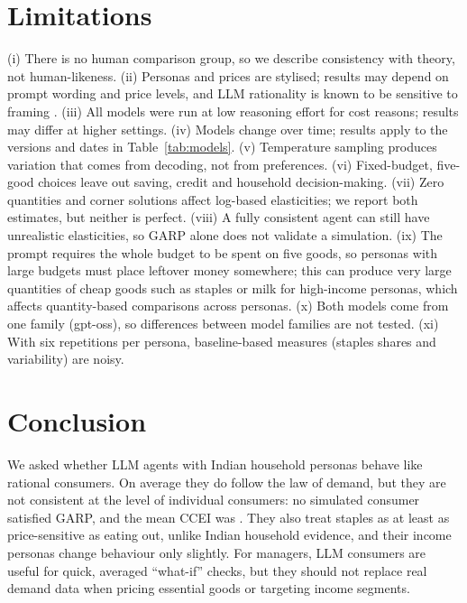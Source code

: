 \documentclass[11pt,a4paper]{article}
\begin{document}
\section{Limitations}
(i) There is no human comparison group, so we describe consistency with theory, not human-likeness. (ii) Personas and prices are stylised; results may depend on prompt wording and price levels, and LLM rationality is known to be sensitive to framing \citep{chen2023}. (iii) All models were run at low reasoning effort for cost reasons; results may differ at higher settings. (iv) Models change over time; results apply to the versions and dates in Table~\ref{tab:models}. (v) Temperature sampling produces variation that comes from decoding, not from preferences. (vi) Fixed-budget, five-good choices leave out saving, credit and household decision-making. (vii) Zero quantities and corner solutions affect log-based elasticities; we report both estimates, but neither is perfect. (viii) A fully consistent agent can still have unrealistic elasticities, so GARP alone does not validate a simulation. (ix) The prompt requires the whole budget to be spent on five goods, so personas with large budgets must place leftover money somewhere; this can produce very large quantities of cheap goods such as staples or milk for high-income personas, which affects quantity-based comparisons across personas. (x) Both models come from one family (gpt-oss), so differences between model families are not tested. (xi) With six repetitions per persona, baseline-based measures (staples shares and variability) are noisy.

\section{Conclusion}
We asked whether LLM agents with Indian household personas behave like rational consumers. On average they do follow the law of demand, but they are not consistent at the level of individual consumers: no simulated consumer satisfied GARP, and the mean CCEI was \MeanCCEI{}. They also treat staples as at least as price-sensitive as eating out, unlike Indian household evidence, and their income personas change behaviour only slightly. For managers, LLM consumers are useful for quick, averaged ``what-if'' checks, but they should not replace real demand data when pricing essential goods or targeting income segments.

\appendix
\end{document}
